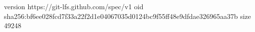 version https://git-lfs.github.com/spec/v1
oid sha256:bf6ee028fcd7f33a22f2d1e04067035d0124bc9f55ff48e9dfdae326965aa37b
size 49248
